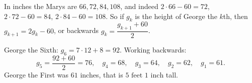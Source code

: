 In inches the Marys are $66,72,84,108$, and indeed $2\cdot66-60=72$, $2\cdot72-60=84$, $2\cdot84-60=108$. So if $g_k$ is the height of George the $k$th, then $g_{k+1}=2g_k-60$, or backwards $g_k=\dfrac{g_{k+1}+60}{2}$.

George the Sixth: $g_6=7\cdot12+8=92$. Working backwards:
\[
g_5=\dfrac{92+60}{2}=76,\quad g_4=68,\quad g_3=64,\quad g_2=62,\quad g_1=61 .
\]
George the First was $61$ inches, that is $\boxed{5\text{ feet }1\text{ inch}}$ tall.
